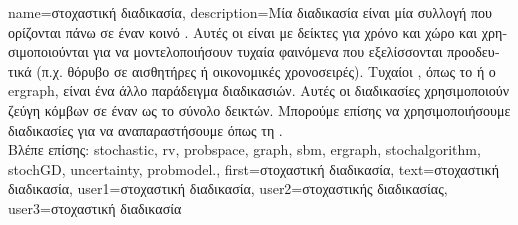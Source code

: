 {name={\foreignlanguage{greek}{στοχαστική διαδικασία}},
	description={\foreignlanguage{greek}{Μία}  
		\foreignlanguage{greek}{διαδικασία είναι μία συλλογή}  \foreignlanguage{greek}{που ορίζονται πάνω 
		σε έναν κοινό} . \foreignlanguage{greek}{Αυτές οι}  \foreignlanguage{greek}{είναι 
		με δείκτες για χρόνο και χώρο και χρησιμοποιούνται για να μοντελοποιήσουν τυχαία φαινόμενα που 
		εξελίσσονται προοδευτικά (π.χ. θόρυβο σε αισθητήρες ή οικονομικές χρονοσειρές). Τυχαίοι} , 
		\foreignlanguage{greek}{όπως το}  \foreignlanguage{greek}{ή ο} \gls{ergraph}, 
		\foreignlanguage{greek}{είναι ένα άλλο παράδειγμα}  \foreignlanguage{greek}{διαδικασιών. 
		Αυτές οι διαδικασίες χρησιμοποιούν ζεύγη κόμβων σε έναν}  \foreignlanguage{greek}{ως το σύνολο 
		δεικτών. Μπορούμε επίσης να χρησιμοποιήσουμε}  \foreignlanguage{greek}{διαδικασίες 
		για να αναπαραστήσουμε}  \foreignlanguage{greek}{όπως τη} . \\
		\foreignlanguage{greek}{Βλέπε επίσης:} \gls{stochastic}, \gls{rv}, \gls{probspace}, \gls{graph}, \gls{sbm}, \gls{ergraph}, 
		\gls{stochalgorithm}, \gls{stochGD}, \gls{uncertainty}, \gls{probmodel}.},
	first={\foreignlanguage{greek}{στοχαστική διαδικασία}},
	text={\foreignlanguage{greek}{στοχαστική διαδικασία}},
	user1={\foreignlanguage{greek}{στοχαστική διαδικασία}}, %
  	user2={\foreignlanguage{greek}{στοχαστικής διαδικασίας}}, %
	user3={\foreignlanguage{greek}{στοχαστική διαδικασία}} %
}

